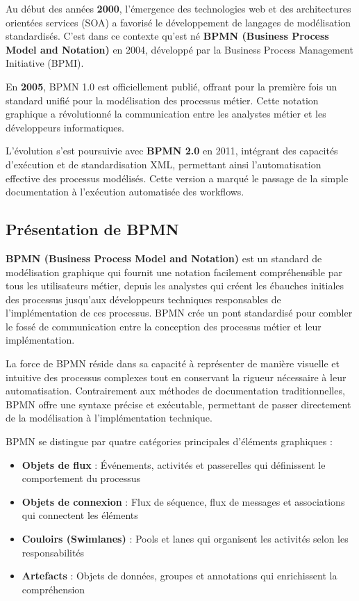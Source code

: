Au début des années \textbf{2000}, l'émergence des technologies web et des architectures orientées services (SOA) a favorisé le développement de langages de modélisation standardisés. C'est dans ce contexte qu'est né \textbf{BPMN (Business Process Model and Notation)} en 2004, développé par la Business Process Management Initiative (BPMI).

En \textbf{2005}, BPMN 1.0 est officiellement publié, offrant pour la première fois un standard unifié pour la modélisation des processus métier. Cette notation graphique a révolutionné la communication entre les analystes métier et les développeurs informatiques.

L'évolution s'est poursuivie avec \textbf{BPMN 2.0} en 2011, intégrant des capacités d'exécution et de standardisation XML, permettant ainsi l'automatisation effective des processus modélisés. Cette version a marqué le passage de la simple documentation à l'exécution automatisée des workflows.

\subsection{Présentation de BPMN}

\textbf{BPMN (Business Process Model and Notation)} est un standard de modélisation graphique qui fournit une notation facilement compréhensible par tous les utilisateurs métier, depuis les analystes qui créent les ébauches initiales des processus jusqu'aux développeurs techniques responsables de l'implémentation de ces processus. BPMN crée un pont standardisé pour combler le fossé de communication entre la conception des processus métier et leur implémentation.

La force de BPMN réside dans sa capacité à représenter de manière visuelle et intuitive des processus complexes tout en conservant la rigueur nécessaire à leur automatisation. Contrairement aux méthodes de documentation traditionnelles, BPMN offre une syntaxe précise et exécutable, permettant de passer directement de la modélisation à l'implémentation technique.

BPMN se distingue par quatre catégories principales d'éléments graphiques :

\begin{itemize}
    \item \textbf{Objets de flux} : Événements, activités et passerelles qui définissent le comportement du processus
    \item \textbf{Objets de connexion} : Flux de séquence, flux de messages et associations qui connectent les éléments
    \item \textbf{Couloirs (Swimlanes)} : Pools et lanes qui organisent les activités selon les responsabilités
    \item \textbf{Artefacts} : Objets de données, groupes et annotations qui enrichissent la compréhension
\end{itemize}

